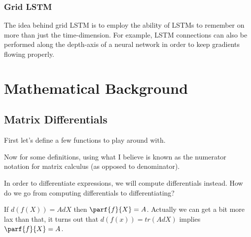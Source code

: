 \documentclass[12pt]{article}
\begin{document}
\subsubsection{Grid LSTM}

The idea behind grid LSTM is to employ the ability of LSTMs to remember on more than just the time-dimension. For example, LSTM connections can also be performed along the depth-axis of a neural network in order to keep gradients flowing properly. 


\section{Mathematical Background}

\subsection{Matrix Differentials}

First let's define a few functions to play around with.


Now for some definitions, using what I believe is known as the numerator notation for matrix calculus (as opposed to denominator).



In order to differentiate expressions, we will compute differentials instead. How do we go from computing differentials to differentiating?

If $d(f(X)) = AdX$ then $\parf{f}{X} = A$. Actually we can get a bit more lax than that, it turns out that $d(f(x)) = tr(AdX)$ implies $\parf{f}{X} = A$. 
\end{document}
